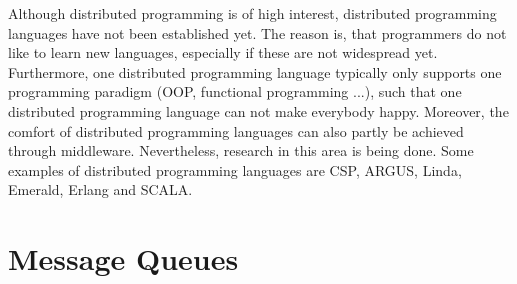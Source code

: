 Although distributed programming is of high interest, distributed programming languages have not been established yet. The reason is, that programmers do not like to learn new languages, especially if these are not widespread yet. Furthermore, one distributed programming language typically only supports one programming paradigm (OOP, functional programming ...), such that one distributed programming language can not make everybody happy. Moreover, the comfort of distributed programming languages can also partly be achieved through middleware. Nevertheless, research in this area is being done. Some examples of distributed programming languages are CSP, ARGUS, Linda, Emerald, Erlang and SCALA.

\section{Message Queues}










